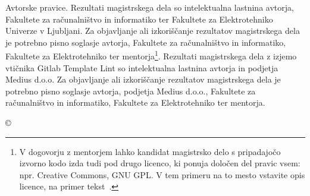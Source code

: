 \thispagestyle{empty}
\vspace*{\fill}
{\noindent\footnotesize
{\sc Avtorske pravice}. 
\ifPROGRAMMM
    Rezultati magistrskega dela so intelektualna lastnina avtorja, Fakultete za ra\-ču\-nal\-niš\-tvo in informatiko ter Fakultete za Elektrotehniko Univerze v Ljubljani. Za objavljanje ali izkoriščanje rezultatov ma\-gi\-str\-ske\-ga dela je potrebno pisno soglasje avtorja, Fakultete za ra\-ču\-nal\-niš\-tvo in informatiko, Fakultete za Elektrotehniko ter mentorja\footnote{V dogovorju z mentorjem lahko kandidat magistrsko delo s pripadajočo izvorno kodo izda tudi pod drugo licenco, ki ponuja določen del pravic vsem: npr. Creative Commons, GNU GPL. V tem primeru na to mesto vstavite opis licence, na primer tekst~\cite{licence}.}.
\else
    Rezultati magistrskega dela z izjemo vtičnika Gitlab Template Lint so intelektualna lastnina avtorja in podjetja Medius d.o.o. Za objavljanje ali izkoriščanje rezultatov ma\-gi\-str\-ske\-ga dela je potrebno pisno soglasje avtorja, podjetja Medius d.o.o., Fakultete za ra\-ču\-nal\-niš\-tvo in informatiko, Fakultete za Elektrotehniko ter mentorja.
\fi    
}
\begin{center}
{\footnotesize{\sc \copyright \myyear\ \tauthor}}
\end{center} 